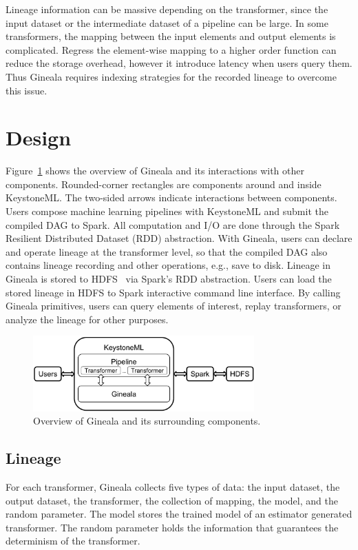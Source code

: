 \documentclass{sig-alternate}
\begin{document}
Lineage information can be massive depending on the transformer, since the input dataset or the intermediate dataset of a pipeline can be large.
In some transformers, the mapping between the input elements and output elements is complicated. 
Regress the element-wise mapping to a higher order function can reduce the storage overhead, however it introduce latency when users
query them. Thus Gineala requires indexing strategies for the recorded lineage to overcome this issue.

\section{Design}
\label{sec:Design}
Figure~\ref{fig:architecture} shows the overview of Gineala and its interactions with other components. 
Rounded-corner rectangles are components around and inside KeystoneML. 
The two-sided arrows indicate interactions between components.
Users compose machine learning pipelines with KeystoneML and submit the compiled DAG to Spark.
All computation and I/O are done through the Spark Resilient Distributed Dataset (RDD) abstraction.
With Gineala, users can declare and operate lineage at the transformer level, 
so that the compiled DAG also contains lineage recording and other operations, e.g., save to disk.
Lineage in Gineala is stored to HDFS~\cite{shvachko10} via Spark's RDD abstraction.
Users can load the stored lineage in HDFS to Spark interactive command line interface.
By calling Gineala primitives, users can query elements of interest, replay transformers, or analyze
the lineage for other purposes.

\begin{figure}[h]
\begin{center}
    \includegraphics[width=85mm]{pictures/architecture}
\caption {Overview of Gineala and its surrounding components.
    \label{fig:architecture}
}
\end{center}
\end{figure}

\subsection{Lineage}
\label{sec:Design-Lineage}
For each transformer, Gineala collects five types of data: the input dataset, the output dataset, the transformer, the collection of mapping, the model, and the random parameter.
The model stores the trained model of an estimator generated transformer.
The random parameter holds the information that guarantees the determinism of the transformer.
\end{document}
